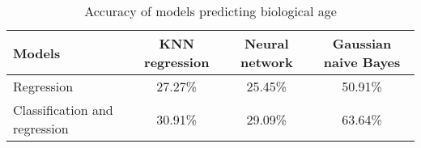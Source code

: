 \begin{table}[!h]
    \centering
    \caption{Accuracy of models predicting biological age}
    \begin{tabular}{l||c|c|c}
        \toprule[0.8pt]
         \textbf{Models} & \textbf{KNN regression} & \textbf{Neural network} & \textbf{Gaussian naive Bayes}\\\hline
         Regression & 27.27\% & 25.45\% & 50.91\%\\
         Classification and regression & 30.91\% & 29.09\% & 63.64\%\\
        \bottomrule[0.8pt]
    \end{tabular}
    \label{tab:bio}
\end{table}